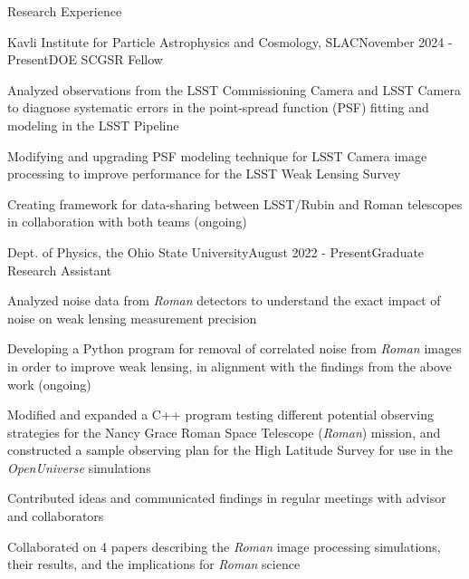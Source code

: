 \documentclass{resume} %
\begin{document}
\begin{rSection}{Research Experience} 

\begin{rSubsection}{Kavli Institute for Particle Astrophysics and Cosmology, SLAC}{November 2024 - Present}{DOE SCGSR Fellow}{}
\item Analyzed observations from the LSST Commissioning Camera and LSST Camera to diagnose systematic errors in the point-spread function (PSF) fitting and modeling in the LSST Pipeline
\item Modifying and upgrading PSF modeling technique for LSST Camera image processing to improve performance for the LSST Weak Lensing Survey
\item Creating framework for data-sharing between LSST/Rubin and Roman telescopes in collaboration with both teams (ongoing)
\end{rSubsection}

\begin{rSubsection}{Dept. of Physics, the Ohio State University}{August 2022 - Present}{Graduate Research Assistant}{}
\item Analyzed noise data from \textit{Roman} detectors to understand the exact impact of noise on weak lensing measurement precision
\item Developing a Python program for removal of correlated noise from \textit{Roman} images in order to improve weak lensing, in alignment with the findings from the above work (ongoing)
\item Modified and expanded a C++ program testing different potential observing strategies for the Nancy Grace Roman Space Telescope (\textit{Roman}) mission, and constructed a sample observing plan for the High Latitude Survey for use in the \textit{OpenUniverse} simulations
\item Contributed ideas and communicated findings in regular meetings with advisor and collaborators
\item Collaborated on 4 papers describing the \textit{Roman} image processing simulations, their results, and the implications for \textit{Roman} science
\end{rSubsection}



\end{rSection}
\end{document}
